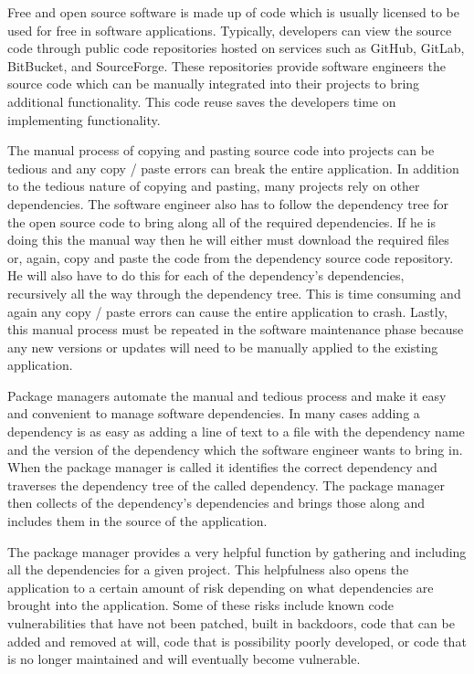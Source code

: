 \documentclass[journal]{IEEEtran}
\begin{document}
Free and open source software is made up of code which is usually licensed to be used for free in software applications. Typically, developers can view the source code through public code repositories hosted on services such as GitHub, GitLab, BitBucket, and SourceForge. These repositories provide software engineers the source code which can be manually integrated into their projects to bring additional functionality. This code reuse saves the developers time on implementing functionality. 

The manual process of copying and pasting source code into projects can be tedious and any copy / paste errors can break the entire application. In addition to the tedious nature of copying and pasting, many projects rely on other dependencies. The software engineer also has to follow the dependency tree for the open source code to bring along all of the required dependencies. If he is doing this the manual way then he will either must download the required files or, again, copy and paste the code from the dependency source code repository. He will also have to do this for each of the dependency’s dependencies, recursively all the way through the dependency tree. This is time consuming and again any copy / paste errors can cause the entire application to crash. Lastly, this manual process must be repeated in the software maintenance phase because any new versions or updates will need to be manually applied to the existing application. 

Package managers automate the manual and tedious process and make it easy and convenient to manage software dependencies. In many cases adding a dependency is as easy as adding a line of text to a file with the dependency name and the version of the dependency which the software engineer wants to bring in. When the package manager is called it identifies the correct dependency and traverses the dependency tree of the called dependency. The package manager then collects of the dependency’s dependencies and brings those along and includes them in the source of the application.

The package manager provides a very helpful function by gathering and including all the dependencies for a given project. This helpfulness also opens the application to a certain amount of risk depending on what dependencies are brought into the application. Some of these risks include known code vulnerabilities that have not been patched, built in backdoors, code that can be added and removed at will, code that is possibility poorly developed, or code that is no longer maintained and will eventually become vulnerable. 
\end{document}
